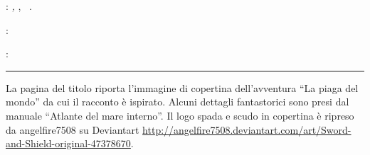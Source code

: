 \thispagestyle{empty}

\hfill

\vfill

\noindent\myName:
\textit{\myTitle,} \mySubTitle,
\textcopyright\ \the\year.

\medskip
{}: \\
\myUrl

\medskip
{}: \\
\mail{\myEmail}

\vspace{1cm}
\hrule
\bigskip

\noindent La pagina del titolo riporta l'immagine di copertina dell'avventura ``La piaga del mondo'' da cui il racconto \`e ispirato.
Alcuni dettagli fantastorici sono presi dal manuale ``Atlante del mare interno''.
Il logo spada e scudo in copertina \`e ripreso da angelfire7508 su Deviantart \url{http://angelfire7508.deviantart.com/art/Sword-and-Shield-original-47378670}.